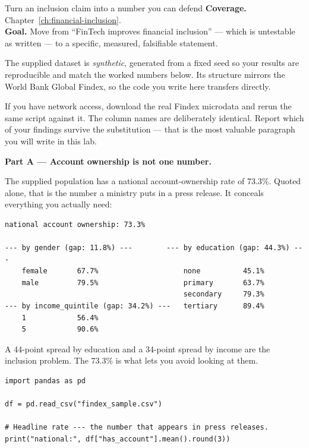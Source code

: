 
\begin{labproject}{Turn an inclusion claim into a number you can defend}
\textbf{Coverage.} Chapter~\ref{ch:financial-inclusion}.\\
\textbf{Goal.} Move from ``FinTech improves financial inclusion'' --- which is untestable as written --- to a specific, measured, falsifiable statement.

\begin{labmode}
The supplied dataset is \emph{synthetic}, generated from a fixed seed so your results are reproducible and match the worked numbers below. Its structure mirrors the World Bank Global Findex, so the code you write here transfers directly.

If you have network access, download the real Findex microdata and rerun the same script against it. The column names are deliberately identical. Report which of your findings survive the substitution --- that is the most valuable paragraph you will write in this lab.
\end{labmode}

\medskip\noindent\textbf{Part A --- Account ownership is not one number.}\par
The supplied population has a national account-ownership rate of 73.3\%. Quoted alone, that is the number a ministry puts in a press release. It conceals everything you actually need:

\begin{lstlisting}[style=utpterminal]
national account ownership: 73.3%

--- by gender (gap: 11.8%) ---        --- by education (gap: 44.3%) ---
    female       67.7%                    none          45.1%
    male         79.5%                    primary       63.7%
                                          secondary     79.3%
--- by income_quintile (gap: 34.2%) ---   tertiary      89.4%
    1            56.4%
    5            90.6%
\end{lstlisting}

A 44-point spread by education and a 34-point spread by income are the inclusion problem. The 73.3\% is what lets you avoid looking at them.

\begin{lstlisting}[style=utppython]
import pandas as pd

df = pd.read_csv("findex_sample.csv")

# Headline rate --- the number that appears in press releases.
print("national:", df["has_account"].mean().round(3))


\end{lstlisting}
\end{labproject}
